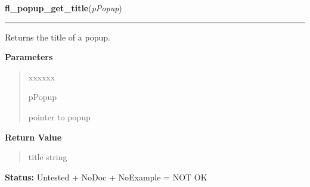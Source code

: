 \hspace{.8\funcindent}\begin{boxedminipage}{\funcwidth}

    \raggedright \textbf{fl\_popup\_get\_title}(\textit{pPopup})

    \vspace{-1.5ex}

    \rule{\textwidth}{0.5\fboxrule}
\setlength{\parskip}{2ex}
    Returns the title of a popup.

\setlength{\parskip}{1ex}
      \textbf{Parameters}
      \vspace{-1ex}

      \begin{quote}
        \begin{Ventry}{xxxxxx}

          \item[pPopup]

          pointer to popup

        \end{Ventry}

      \end{quote}

      \textbf{Return Value}
    \vspace{-1ex}

      \begin{quote}
      title string

      \end{quote}

\textbf{Status:} Untested + NoDoc + NoExample = NOT OK



    \end{boxedminipage}

    \label{xformslib:library:fl_popup_set_title}

    \vspace{0.5ex}


